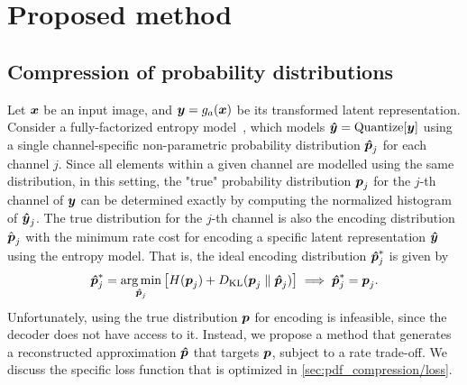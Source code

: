 \section{Proposed method}

\subsection{Compression of probability distributions}


Let ${\boldsymbol{x}}$ be an input image, and ${\boldsymbol{y}} = g_a({\boldsymbol{x}})$ be its transformed latent representation.
Consider a fully-factorized entropy model~\cite{balle2018variational}, which models ${\boldsymbol{\hat{y}}} = \operatorname{Quantize}[{\boldsymbol{y}}]$ using a single channel-specific non-parametric probability distribution ${\boldsymbol{\hat{p}}}_j$ for each channel $j$.
Since all elements within a given channel are modelled using the same distribution, in this setting, the "true" probability distribution ${\boldsymbol{p}}_j$ for the $j$-th channel of ${\boldsymbol{y}}$ can be determined exactly by computing the normalized histogram of ${\boldsymbol{\hat{y}}}_j$.
The true distribution for the $j$-th channel is also the encoding distribution $\hat{{\boldsymbol{p}}}_j$ with the minimum rate cost for encoding a specific latent representation ${\boldsymbol{\hat{y}}}$ using the entropy model.
That is, the ideal encoding distribution ${\boldsymbol{\hat{p}}}^*_j$ is given by
\begin{equation*}
  {\boldsymbol{\hat{p}}}^*_j = \operatorname*{arg\,min}_{{\boldsymbol{\hat{p}}}_j} \left[
    H({\boldsymbol{p}}_j) + D_{\mathrm{KL}}({\boldsymbol{p}}_j \parallel {\boldsymbol{\hat{p}}}_j)
  \right]
  \implies {\boldsymbol{\hat{p}}}^*_j = {\boldsymbol{p}}_j.
\end{equation*}
Unfortunately, using the true distribution ${\boldsymbol{p}}$ for encoding is infeasible, since the decoder does not have access to it.
Instead, we propose a method that generates a reconstructed approximation ${\boldsymbol{\hat{p}}}$ that targets ${\boldsymbol{p}}$, subject to a rate trade-off.
We discuss the specific loss function that is optimized in \cref{sec:pdf_compression/loss}.

